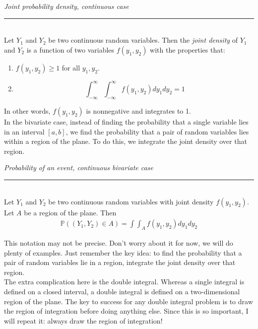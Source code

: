 \documentclass[12pt]{article}
\theoremstyle{definition}
\theoremstyle{remark}
\def\P{{\mathbb P}}
\begin{document}
\begin{framed}
\emph{Joint probability density, continuous case}\\
  \rule{\dimexpr{}\fboxrule}{.1pt} \\
Let $Y_1$ and $Y_2$ be two continuous random variables. Then the \emph{joint density} of $Y_1$ and $Y_2$ is a function of two variables $f(y_1, y_2)$ with the properties that:
\begin{enumerate}
\item $f(y_1, y_2) \geq 1$ for all $y_1, y_2$.
\item \[
\int_{-\infty}^\infty \int_{-\infty}^\infty f(y_1, y_2) dy_1 dy_2 = 1
\]
\end{enumerate}
\end{framed}
In other words, $f(y_1, y_2)$ is nonnegative and integrates to 1.\\

In the bivariate case, instead of finding the probability that a single variable lies in an interval $[a, b]$, we find the probability that a pair of random variables lies within a region of the plane. To do this, we integrate the joint density over that region.

\begin{framed}
\emph{Probability of an event, continuous bivariate case}\\
  \rule{\dimexpr{}\fboxrule}{.1pt} \\
Let $Y_1$ and $Y_2$ be two continuous random variables with joint density $f(y_1, y_2)$. Let $A$ be a region of the plane. Then
\begin{align*}
\P((Y_1, Y_2) \in A) =  \int \int_A f(y_1, y_2) dy_1 dy_2
\end{align*}
\end{framed}
This notation may not be precise. Don't worry about it for now, we will do plenty of examples. Just remember the key idea: to find the probability that a pair of random variables lie in a region, integrate the joint density over that region.\\

The extra complication here is the double integral. Whereas a single integral is defined on a closed interval, a double integral is defined on a two-dimensional region of the plane. The key to success for any double integral problem is to draw the region of integration before doing anything else. Since this is so important, I will repeat it: always draw the region of integration!\\
\end{document}
